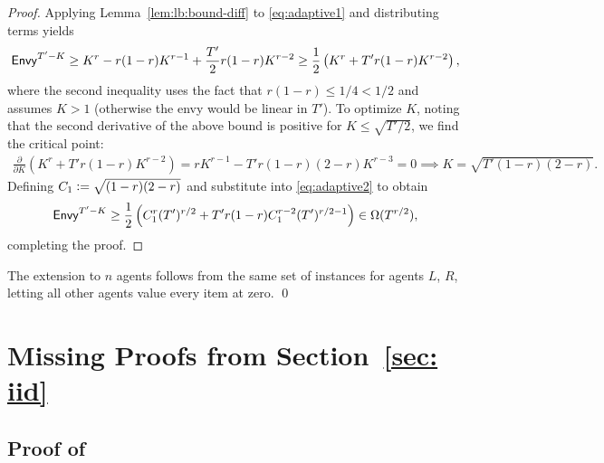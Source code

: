 \begin{proof}
Applying Lemma~\ref{lem:lb:bound-diff}  to \eqref{eq:adaptive1} and distributing terms yields
\begin{align}
\mathsf{Envy}^{T'-K} \geq K^r - r (1-r) K^{r-1} + \frac{T'}{2} r (1-r) K^{r-2} \geq \frac{1}{2} \left( K^r + {T'} r (1-r) K^{r-2} \right), \label{eq:adaptive2}
\end{align}
where the second inequality uses the fact that $r(1-r) \le 1/4 < 1/2$ and assumes $K > 1$ (otherwise the envy would be linear in $T'$).
To optimize $K$, noting that the second derivative of the above bound is positive for $K\leq \sqrt{T'/2}$, we find the critical point:
\begin{align*}
\frac{\partial}{\partial K} \left(K^r + {T'} r (1-r) K^{r-2}\right) = r K^{r-1} - T'r(1-r)(2-r) K^{r-3} = 0  \implies  K = \sqrt{T'(1-r)(2-r)}.
\end{align*}
Defining $C_1 \vcentcolon= \sqrt{(1-r)(2-r)}$ and  substitute  into \eqref{eq:adaptive2} to obtain
\begin{align}
	\mathsf{Envy}^{T'-K} 
	\ge \frac{1}{2} \left(C_1^r (T')^{r/2} + T' r (1-r) C_1^{r-2} (T')^{r/2 -1} \right)
	\in \Omega(T^{r/2}),
\end{align}
completing the proof.
\end{proof}

The extension to $n$ agents follows from the same set of instances for agents $L$, $R$, letting all other agents value every item at zero. \qed


\section{Missing Proofs from Section~\ref{sec: iid}}\label{app:missing proofs from iid}

\subsection{Proof of }


